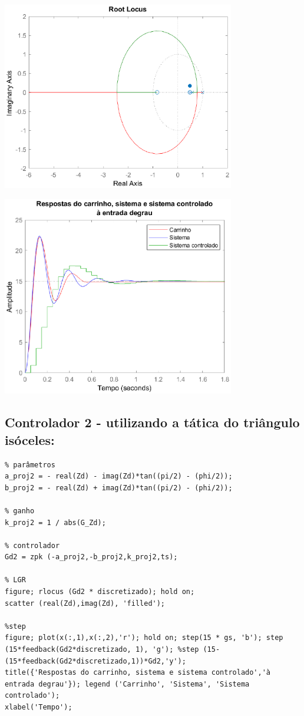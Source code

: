 \documentclass{article}
\begin{document}
\includegraphics [width=4in]{images/Matlab/identifica_03.eps}

\includegraphics [width=4in]{images/Matlab/identifica_04.eps}


\subsection*{Controlador 2 - utilizando a tática do triângulo isóceles:}

\begin{lstlisting}
% parâmetros
a_proj2 = - real(Zd) - imag(Zd)*tan((pi/2) - (phi/2));
b_proj2 = - real(Zd) + imag(Zd)*tan((pi/2) - (phi/2));

% ganho
k_proj2 = 1 / abs(G_Zd);

% controlador
Gd2 = zpk (-a_proj2,-b_proj2,k_proj2,ts);

% LGR
figure; rlocus (Gd2 * discretizado); hold on;
scatter (real(Zd),imag(Zd), 'filled');

%step
figure; plot(x(:,1),x(:,2),'r'); hold on; step(15 * gs, 'b'); step (15*feedback(Gd2*discretizado, 1), 'g'); %step (15-(15*feedback(Gd2*discretizado,1))*Gd2,'y');
title({'Respostas do carrinho, sistema e sistema controlado','à entrada degrau'}); legend ('Carrinho', 'Sistema', 'Sistema controlado');
xlabel('Tempo');
\end{lstlisting}
\end{document}
